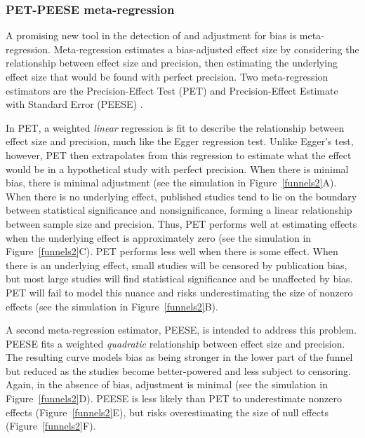\documentclass[man]{apa6}
\begin{document}
\subsubsection{PET-PEESE meta-regression}
A promising new tool in the detection of and adjustment for bias is meta-regression. Meta-regression estimates a bias-adjusted effect size by considering the relationship between effect size and precision, then estimating the underlying effect size that would be found with perfect precision. Two meta-regression estimators are the Precision-Effect Test (PET) and Precision-Effect Estimate with Standard Error (PEESE) \citep{Stanley:Doucouliagos:2014}. %

In PET, a weighted {\em linear} regression is fit to describe the relationship between effect size and precision, much like the Egger regression test. Unlike Egger's test, however, PET then extrapolates from this regression to estimate what the effect would be in a hypothetical study with perfect precision. When there is minimal bias, there is minimal adjustment (see the simulation in Figure~\ref{funnels2}A). When there is no underlying effect, published studies tend to lie on the boundary between statistical significance and nonsignificance, forming a linear relationship between sample size and precision. Thus, PET performs well at estimating effects when the underlying effect is approximately zero (see the simulation in Figure~\ref{funnels2}C). PET performs less well when there is some effect. When there is an underlying effect, small studies will be censored by publication bias, but most large studies will find statistical significance and be unaffected by bias. PET will fail to model this nuance and risks underestimating the size of nonzero effects (see the simulation in Figure~\ref{funnels2}B).

A second meta-regression estimator, PEESE, is intended to address this problem. PEESE fits a weighted {\em quadratic} relationship between effect size and precision. The resulting curve models bias as being stronger in the lower part of the funnel but reduced as the studies become better-powered and less subject to censoring. Again, in the absence of bias, adjustment is minimal (see the simulation in Figure~\ref{funnels2}D). PEESE is less likely than PET to underestimate nonzero effects (Figure~\ref{funnels2}E), but risks overestimating the size of null effects (Figure~\ref{funnels2}F).
\end{document}
